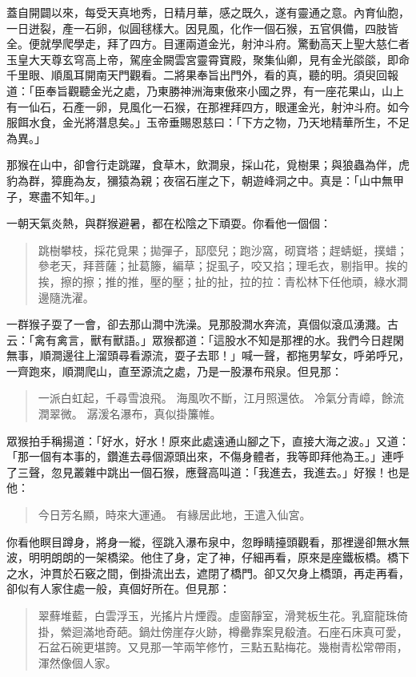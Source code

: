 蓋自開闢以來，每受天真地秀，日精月華，感之既久，遂有靈通之意。內育仙胞，一日迸裂，產一石卵，似圓毬樣大。因見風，化作一個石猴，五官俱備，四肢皆全。便就學爬學走，拜了四方。目運兩道金光，射沖斗府。驚動高天上聖大慈仁者玉皇大天尊玄穹高上帝，駕座金闕雲宮靈霄寶殿，聚集仙卿，見有金光燄燄，即命千里眼、順風耳開南天門觀看。二將果奉旨出門外，看的真，聽的明。須臾回報道：「臣奉旨觀聽金光之處，乃東勝神洲海東傲來小國之界，有一座花果山，山上有一仙石，石產一卵，見風化一石猴，在那裡拜四方，眼運金光，射沖斗府。如今服餌水食，金光將潛息矣。」玉帝垂賜恩慈曰：「下方之物，乃天地精華所生，不足為異。」

那猴在山中，卻會行走跳躍，食草木，飲澗泉，採山花，覓樹果；與狼蟲為伴，虎豹為群，獐鹿為友，獼猿為親；夜宿石崖之下，朝遊峰洞之中。真是：「山中無甲子，寒盡不知年。」

一朝天氣炎熱，與群猴避暑，都在松陰之下頑耍。你看他一個個：
\begin{quote}
跳樹攀枝，採花覓果；拋彈子，邷麼兒；跑沙窩，砌寶塔；趕蜻蜓，撲蜡；參老天，拜菩薩；扯葛籐，編草；捉虱子，咬又掐；理毛衣，剔指甲。挨的挨，擦的擦；推的推，壓的壓；扯的扯，拉的拉：青松林下任他頑，綠水澗邊隨洗濯。
\end{quote}

一群猴子耍了一會，卻去那山澗中洗澡。見那股澗水奔流，真個似滾瓜湧濺。古云：「禽有禽言，獸有獸語。」眾猴都道：「這股水不知是那裡的水。我們今日趕閑無事，順澗邊往上溜頭尋看源流，耍子去耶！」喊一聲，都拖男挈女，呼弟呼兄，一齊跑來，順澗爬山，直至源流之處，乃是一股瀑布飛泉。但見那：
\begin{quote}
一派白虹起，千尋雪浪飛。
海風吹不斷，江月照還依。
冷氣分青嶂，餘流潤翠微。
潺湲名瀑布，真似掛簾帷。
\end{quote}

眾猴拍手稱揚道：「好水，好水！原來此處遠通山腳之下，直接大海之波。」又道：「那一個有本事的，鑽進去尋個源頭出來，不傷身體者，我等即拜他為王。」連呼了三聲，忽見叢雜中跳出一個石猴，應聲高叫道：「我進去，我進去。」好猴！也是他：
\begin{quote}
今日芳名顯，時來大運通。
有緣居此地，王遣入仙宮。
\end{quote}

你看他瞑目蹲身，將身一縱，徑跳入瀑布泉中，忽睜睛擡頭觀看，那裡邊卻無水無波，明明朗朗的一架橋梁。他住了身，定了神，仔細再看，原來是座鐵板橋。橋下之水，沖貫於石竅之間，倒掛流出去，遮閉了橋門。卻又欠身上橋頭，再走再看，卻似有人家住處一般，真個好所在。但見那：
\begin{quote}
翠蘚堆藍，白雲浮玉，光搖片片煙霞。虛窗靜室，滑凳板生花。乳窟龍珠倚掛，縈迴滿地奇葩。鍋灶傍崖存火跡，樽罍靠案見殽渣。石座石床真可愛，石盆石碗更堪誇。又見那一竿兩竿修竹，三點五點梅花。幾樹青松常帶雨，渾然像個人家。
\end{quote}

